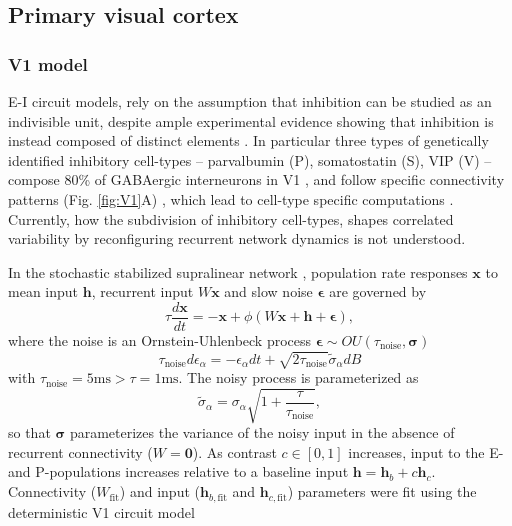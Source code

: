 \documentclass[11pt]{article}
\begin{document}
\subsection{Primary visual cortex}\label{methods_V1}
\subsubsection{V1 model}
 E-I circuit models, rely on the assumption that inhibition can be studied as an indivisible unit, despite ample experimental evidence showing that inhibition is instead composed of distinct elements \cite{tremblay2016}. In particular three types of genetically identified inhibitory cell-types -- parvalbumin (P), somatostatin (S), VIP (V) --
compose 80\% of GABAergic interneurons in V1 \cite{markram2004interneurons, rudy2011three, tremblay2016}, and follow specific connectivity patterns (Fig. \ref{fig:V1}A) \cite{pfeffer2013inhibition}, which lead to cell-type specific computations \cite{Mossing2021,palmigiano2020structure}. Currently, how the subdivision of inhibitory cell-types, shapes correlated variability by reconfiguring  recurrent network dynamics is not understood.

In the stochastic stabilized supralinear network \cite{hennequin2018dynamical}, population rate responses $\mathbf{x}$ to mean input $\mathbf{h}$, recurrent input $W\mathbf{x}$ and slow noise $\bm{\epsilon}$ are governed by
\begin{equation}
    \tau \frac{d\mathbf{x}}{dt} = -\mathbf{x} +\phi(W\mathbf{x} + \mathbf{h} + \bm{\epsilon}),
\end{equation}
where the noise is an Ornstein-Uhlenbeck process $\bm{\epsilon} \sim OU(\tau_{\text{noise}}, \bm{\sigma})$
\begin{equation}
\tau_{\text{noise}} d\epsilon_\alpha = -\epsilon_\alpha dt + \sqrt{2\tau_{\text{noise}}}\tilde{\sigma}_\alpha dB
\end{equation}
with $\tau_{\text{noise}} = 5\text{ms} > \tau = 1\text{ms}$.
The noisy process is parameterized as
\begin{equation} \label{sigma_reparam}
\tilde{\sigma}_\alpha = \sigma_\alpha \sqrt{1 + \frac{\tau}{\tau_{\text{noise}}}},
\end{equation}
so that $\bm{\sigma}$ parameterizes the variance of the noisy input in the absence of recurrent connectivity ($W = \bm{0}$).
As contrast $c \in [0, 1]$ increases, input to the E- and P-populations increases  relative to a baseline input $\mathbf{h} = \mathbf{h}_b + c\mathbf{h}_c$.
Connectivity ($W_{\text{fit}}$) and input ($\mathbf{h}_{b,\text{fit}}$ and $\mathbf{h}_{c,\text{fit}}$) parameters were fit using the deterministic V1 circuit model \cite{palmigiano2020structure} 
\end{document}
